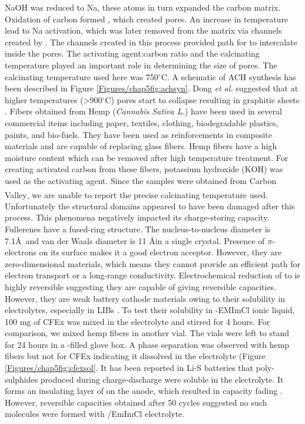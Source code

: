 NaOH was reduced to Na, these atoms in turn expanded the carbon matrix. Oxidation of carbon formed , which created pores. An increase in temperature lead to Na activation, which was later removed from the matrix via channels created by . The channels created in this process provided path for  to intercalate inside the pores. The activating agent:carbon ratio and the calcinating temperature played an important role in determining the size of pores. The calcinating temperature used here was 750$^{\circ}$C. A schematic of ACH synthesis has been described in Figure \ref{Figures/chap5fig:achsyn}. Dong \textit{et al.} suggested that at higher temperatures (>900$^{\circ}$C) pores start to collapse resulting in graphitic sheets \cite{dong_commercial_2019}. 
Fibers obtained from Hemp (\textit{Cannabis Sativa L.}) have been used in several commercial items including paper, textiles, clothing, biodegradable plastics, paints, and bio-fuels. They have been used as reinforcements in composite materials and are capable of replacing glass fibers. Hemp fibers have a high moisture content which can be removed after high temperature treatment\cite{hussain_development_2019}. For creating activated carbon from these fibers, potassium hydroxide (KOH) was used as the activating agent. Since the samples were obtained from Carbon Valley\textsuperscript{\textregistered}, we are unable to report the precise calcinating temperature used. Unfortunately the structural domains appeared to have been damaged after this process. This phenomena negatively impacted its charge-storing capacity.  
Fullerenes have a fused-ring structure. The nucleus-to-nucleus diameter is 7.1\AA\ and van der Waals diameter is 11 \AA in a single crystal. Presence of $\pi$-electrons on its surface makes it a good electron acceptor. However, they are zero-dimensional materials, which means they cannot provide an efficient path for electron transport or a long-range conductivity\cite{loutfy_fullerene_2002, winkler_two-component_2007}. Electrochemical reduction of  to  is highly reversible suggesting they are capable of giving reversible capacities. However, they are weak battery cathode materials owing to their solubility in electrolytes, especially in LIBs \cite{seger_prospects_1991}. To test their solubility in -EMImCl ionic liquid, 100 mg of CFEx was mixed in the electrolyte and stirred for 4 hours. For comparison, we mixed hemp fibers in another vial. The vials were left to stand for 24 hours in a -filled glove box. A phase separation was observed with hemp fibers but not for CFEx indicating it dissolved in the electrolyte (Figure \ref{Figures/chap5fig:cfexsol}. It has been reported in Li-S batteries that poly-sulphides produced during charge-discharge were soluble in the electrolyte. It forms an insulating layer of  on the anode, which resulted in capacity fading \cite{sun_effect_2017}. However, reversible capacities obtained after 50 cycles suggested no such molecules were formed with /EmImCl electrolyte. 

